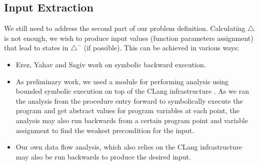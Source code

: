 \subsection{Input Extraction} \label{SubSec:Input}
We still need to address the second part of our problem definition. Calculating $\triangle$ is not enough, we wish to produce input values (function parameters assignment) that lead to states in $\triangle^-$ (if possible). This can be achieved in various ways:
\begin{itemize}
\item Erez, Yahav and Sagiv \cite{InputGen} work on symbolic backward execution.
\item As preliminary work, we used a module for performing analysis using bounded symbolic execution on top of the CLang infrastructure \cite{CLang}. As we ran the analysis from the procedure entry forward to symbolically execute the program and get abstract values for program variables at each point, the analysis may also run backwards from a certain program point and variable assignment to find the weakest precondition \cite{kn:Dijkstra} for the input.
\item Our own data flow analysis, which also relies on the CLang infrastructure \cite{CLang} may also be run backwards to produce the desired input.
\end{itemize}
